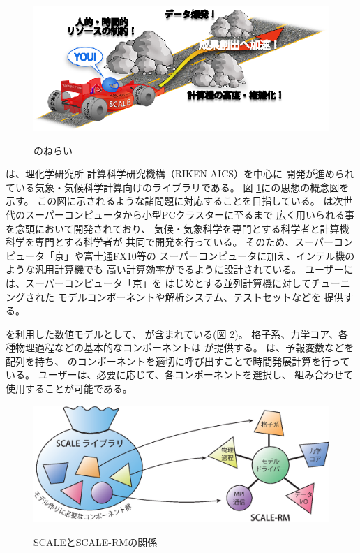 \begin{figure}[htb]
\begin{center}
  \includegraphics[width=0.9\hsize]{./figure/library.eps}\\
  \caption{\scalelib のねらい}
  \label{fig:scale}
\end{center}
\end{figure}

\scalelib は、理化学研究所 計算科学研究機構（RIKEN AICS）を中心に
開発が進められている気象・気候科学計算向けのライブラリである。
図 \ref{fig:scale}に\scalelib の思想の概念図を示す。
この図に示されるような諸問題に対応することを目指している。
\scalelib は次世代のスーパーコンピュータから小型PCクラスターに至るまで
広く用いられる事を念頭において開発されており、
気候・気象科学を専門とする科学者と計算機科学を専門とする科学者が
共同で開発を行っている。
そのため、スーパーコンピュータ「京」や富士通FX10等の
スーパーコンピュータに加え、インテル機のような汎用計算機でも
高い計算効率がでるように設計されている。
ユーザーには、スーパーコンピュータ「京」を
はじめとする並列計算機に対してチューニングされた
モデルコンポーネントや解析システム、テストセットなどを
提供する。


\scalelib を利用した数値モデルとして、
\scalerm が含まれている(図 \ref{fig:scale-rm})。
格子系、力学コア、各種物理過程などの基本的なコンポーネントは
\scalelib が提供する。
\scalerm は、予報変数などを配列を持ち、
\scalelib のコンポーネントを適切に呼び出すことで時間発展計算を行っている。
ユーザーは、必要に応じて、各コンポーネントを選択し、
組み合わせて使用することが可能である。


\begin{figure}[hbt]
\begin{center}
  \includegraphics[width=0.9\hsize]{./figure/scale.eps}\\
  \caption{SCALEとSCALE-RMの関係}
  \label{fig:scale-rm}
\end{center}
\end{figure}


